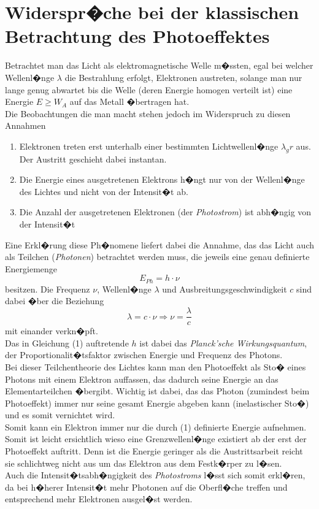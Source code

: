 \documentclass[a4paper, 10pt]{report}%
\begin{document}
\section{Widerspr�che bei der klassischen Betrachtung des Photoeffektes}
Betrachtet man das Licht als elektromagnetische Welle m�ssten, egal bei welcher Wellenl�nge $\lambda$ die Bestrahlung erfolgt, Elektronen austreten, solange man nur lange genug abwartet bis die Welle (deren Energie homogen verteilt ist) eine Energie $E \geq W_A$ auf das Metall �bertragen hat.\\
Die Beobachtungen die man macht stehen jedoch im Widerspruch zu diesen Annahmen
\begin{enumerate}
 \item Elektronen treten erst unterhalb einer bestimmten Lichtwellenl�nge $\lambda_gr$ aus. Der Austritt geschieht dabei instantan.
 \item Die Energie eines ausgetretenen Elektrons h�ngt nur von der Wellenl�nge des Lichtes und nicht von der Intensit�t ab.
 \item Die Anzahl der ausgetretenen Elektronen (der \textit{Photostrom}) ist abh�ngig von der Intensit�t
\end{enumerate}
Eine Erkl�rung diese Ph�nomene liefert dabei die Annahme, das das Licht auch als Teilchen (\textit{Photonen}) betrachtet werden muss, die jeweils eine genau definierte Energiemenge
\begin{equation}
E_{Ph} = h \cdot \nu
\end{equation}
besitzen. Die Frequenz $\nu$, Wellenl�nge $\lambda$ und Ausbreitungsgeschwindigkeit $c$ sind dabei �ber die Beziehung
\begin{equation}
\lambda = c \cdot \nu \Rightarrow \nu = \frac{\lambda}{c}
\end{equation}
mit einander verkn�pft.\\
Das in Gleichung (1) auftretende $h$ ist dabei das \textit{Planck'sche Wirkungsquantum}, der Proportionalit�tsfaktor zwischen Energie und Frequenz des Photons.\\
Bei dieser Teilchentheorie des Lichtes kann man den Photoeffekt als Sto� eines Photons mit einem Elektron auffassen, das dadurch seine Energie an das Elementarteilchen �bergibt. Wichtig ist dabei, das das Photon (zumindest beim Photoeffekt) immer nur seine gesamt Energie abgeben kann (inelastischer Sto�) und es somit vernichtet wird.\\
Somit kann ein Elektron immer nur die durch (1) definierte Energie aufnehmen. Somit ist leicht ersichtlich wieso eine Grenzwellenl�nge existiert ab der erst der Photoeffekt auftritt. Denn ist die Energie geringer als die Austrittsarbeit reicht sie schlichtweg nicht aus um das Elektron aus dem Festk�rper zu l�sen.\\
Auch die Intensit�tsabh�ngigkeit des \textit{Photostroms} l�sst sich somit erkl�ren, da bei h�herer Intensit�t mehr Photonen auf die Oberfl�che treffen und entsprechend mehr Elektronen ausgel�st werden.\\
\end{document}

